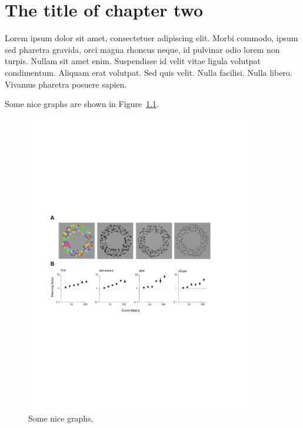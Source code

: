 \chapter{The title of chapter two}

Lorem ipsum dolor sit amet, consectetuer adipiscing elit. Morbi commodo, ipsum sed pharetra gravida, orci magna rhoncus neque, id pulvinar odio lorem non turpis. Nullam sit amet enim. Suspendisse id velit vitae ligula volutpat condimentum. Aliquam erat volutpat. Sed quis velit. Nulla facilisi. Nulla libero. Vivamus pharetra posuere sapien. 

Some nice graphs are shown in Figure~\ref{fig:label2}.

\begin{figure}[htbp]
\begin{center}
\includegraphics[width=4in]{figures/fig1.pdf}
\caption{Some nice graphs.}
\label{fig:label2}
\end{center}
\end{figure}